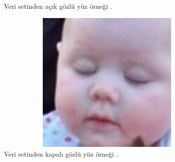 \documentclass[12pt, a4paper]{article}
\begin{document}
\begin{itemize}
\begin{figure}[!h]
		\caption{Veri setinden açık gözlü yüz örneği \cite{mrl}.}\end{figure}
		\begin{figure}[!h]
		\centering
		\includegraphics[width=17cm, height=7cm, keepaspectratio]{closed_eye_0047.jpg_face_2.jpg}
		\caption{Veri setinden kapalı gözlü yüz örneği \cite{mrl}.} 
		\end{figure}\par
	\end{itemize}
\end{document}

